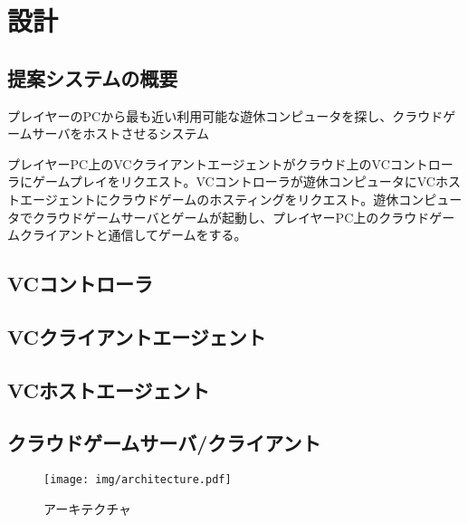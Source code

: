 \section{設計}

\subsection{提案システムの概要}
プレイヤーのPCから最も近い利用可能な遊休コンピュータを探し、クラウドゲームサーバをホストさせるシステム

プレイヤーPC上のVCクライアントエージェントがクラウド上のVCコントローラにゲームプレイをリクエスト。VCコントローラが遊休コンピュータにVCホストエージェントにクラウドゲームのホスティングをリクエスト。遊休コンピュータでクラウドゲームサーバとゲームが起動し、プレイヤーPC上のクラウドゲームクライアントと通信してゲームをする。

\subsection{VCコントローラ}

\subsection{VCクライアントエージェント}

\subsection{VCホストエージェント}

\subsection{クラウドゲームサーバ/クライアント}

\begin{figure*}[t]
    \centering
    \texttt{[image: img/architecture.pdf]}
    \caption{アーキテクチャ}
    \label{fig:arch}
\end{figure*}
